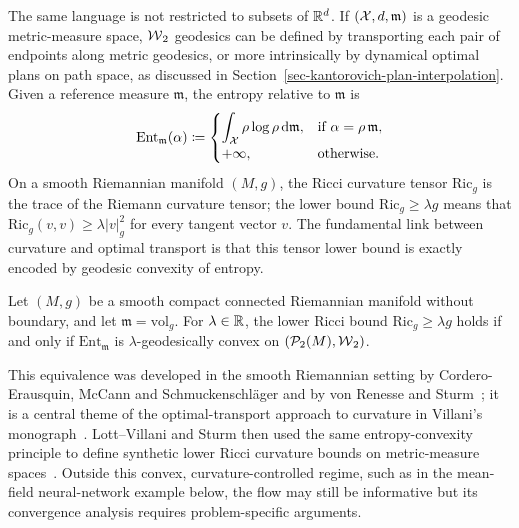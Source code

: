 The same language is not restricted to subsets of $\mathbb{R}^d$. If $(\mathcal{X},d,\mathfrak m)$ is a geodesic metric-measure space, $\operatorname{\mathcal{W}}_2$ geodesics can be defined by transporting each pair of endpoints along metric geodesics, or more intrinsically by dynamical optimal plans on path space, as discussed in Section~\ref{sec-kantorovich-plan-interpolation}. Given a reference measure $\mathfrak m$, the entropy relative to $\mathfrak m$ is
\[
	\mathrm{Ent}_{\mathfrak m}(\alpha)
	\coloneqq
	\begin{cases}
		\displaystyle \int_{\mathcal{X}} \rho\log\rho\,\mathrm{d}\mathfrak m,
		& \text{if } \alpha=\rho\,\mathfrak m,\\
		+\infty,
		& \text{otherwise.}
	\end{cases}
\]
On a smooth Riemannian manifold $(M,g)$, the Ricci curvature tensor $\mathrm{Ric}_g$ is the trace of the Riemann curvature tensor; the lower bound $\mathrm{Ric}_g\geq\lambda g$ means that $\mathrm{Ric}_g(v,v)\geq\lambda |v|_g^2$ for every tangent vector $v$. The fundamental link between curvature and optimal transport is that this tensor lower bound is exactly encoded by geodesic convexity of entropy.

\begin{thm}\label{thm-ricci-entropy-convexity}
	Let $(M,g)$ be a smooth compact connected Riemannian manifold without boundary, and let $\mathfrak m=\mathrm{vol}_g$. For $\lambda\in\mathbb{R}$, the lower Ricci bound $\mathrm{Ric}_g\geq\lambda g$ holds if and only if $\mathrm{Ent}_{\mathfrak m}$ is $\lambda$-geodesically convex on $(\mathcal{P}_2(M),\operatorname{\mathcal{W}}_2)$.
\end{thm}

This equivalence was developed in the smooth Riemannian setting by Cordero-Erausquin, McCann and Schmuckenschl{\"a}ger and by von Renesse and Sturm~\cite{cordero2001riemannian,vonrenesse2005transport}; it is a central theme of the optimal-transport approach to curvature in Villani's monograph~\cite{Villani09}. Lott--Villani and Sturm then used the same entropy-convexity principle to define synthetic lower Ricci curvature bounds on metric-measure spaces~\cite{lott2009ricci,sturm2006geometry1,sturm2006geometry2}. Outside this convex, curvature-controlled regime, such as in the mean-field neural-network example below, the flow may still be informative but its convergence analysis requires problem-specific arguments.


